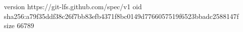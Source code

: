 version https://git-lfs.github.com/spec/v1
oid sha256:a79f35ddf38c26f7bb83efb4371f8bc0149d7766057519f6523bbadc2588147f
size 66789
